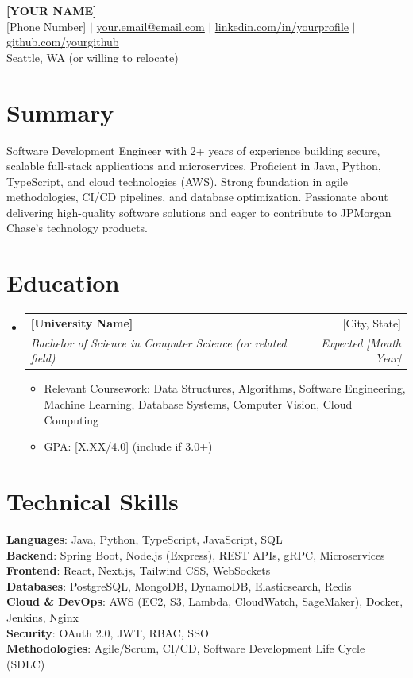 \documentclass[letterpaper,11pt]{article}
\makeatletter
\newcommand{\resumeItem}[1]{
  \item\small{
    {#1 \vspace{-2pt}}
  }
}
\newcommand{\resumeSubheading}[4]{
  \vspace{-2pt}\item
    \begin{tabular*}{0.97\textwidth}[t]{l@{\extracolsep{\fill}}r}
      \textbf{#1} & #2 \\
      \textit{\small#3} & \textit{\small #4} \\
    \end{tabular*}\vspace{-7pt}
}
\newcommand{\resumeSubHeadingListStart}{\begin{itemize}[leftmargin=0.15in, label={}]}
\newcommand{\resumeSubHeadingListEnd}{\end{itemize}}
\newcommand{\resumeItemListStart}{\begin{itemize}}
\newcommand{\resumeItemListEnd}{\end{itemize}\vspace{-5pt}}
\makeatother
\begin{document}
\begin{center}
    \textbf{\Huge \scshape [YOUR NAME]} \\ \vspace{1pt}
    \small [Phone Number] $|$ \href{mailto:your.email@email.com}{\underline{your.email@email.com}} $|$ 
    \href{https://linkedin.com/in/yourprofile}{\underline{linkedin.com/in/yourprofile}} $|$
    \href{https://github.com/yourgithub}{\underline{github.com/yourgithub}} \\
    \small Seattle, WA (or willing to relocate)
\end{center}

\section{Summary}
Software Development Engineer with 2+ years of experience building secure, scalable full-stack applications and microservices. Proficient in Java, Python, TypeScript, and cloud technologies (AWS). Strong foundation in agile methodologies, CI/CD pipelines, and database optimization. Passionate about delivering high-quality software solutions and eager to contribute to JPMorgan Chase's technology products.

\section{Education}
  \resumeSubHeadingListStart
    \resumeSubheading
      {[University Name]}{[City, State]}
      {Bachelor of Science in Computer Science (or related field)}{Expected [Month Year]}
      \resumeItemListStart
        \resumeItem{Relevant Coursework: Data Structures, Algorithms, Software Engineering, Machine Learning, Database Systems, Computer Vision, Cloud Computing}
        \resumeItem{GPA: [X.XX/4.0] (include if 3.0+)}
      \resumeItemListEnd
  \resumeSubHeadingListEnd

\section{Technical Skills}
 \begin{itemize}[leftmargin=0.15in, label={}]
    \small{\item{
     \textbf{Languages}{: Java, Python, TypeScript, JavaScript, SQL} \\
     \textbf{Backend}{: Spring Boot, Node.js (Express), REST APIs, gRPC, Microservices} \\
     \textbf{Frontend}{: React, Next.js, Tailwind CSS, WebSockets} \\
     \textbf{Databases}{: PostgreSQL, MongoDB, DynamoDB, Elasticsearch, Redis} \\
     \textbf{Cloud \& DevOps}{: AWS (EC2, S3, Lambda, CloudWatch, SageMaker), Docker, Jenkins, Nginx} \\
     \textbf{Security}{: OAuth 2.0, JWT, RBAC, SSO} \\
     \textbf{Methodologies}{: Agile/Scrum, CI/CD, Software Development Life Cycle (SDLC)}
    }}
 \end{itemize}
\end{document}
